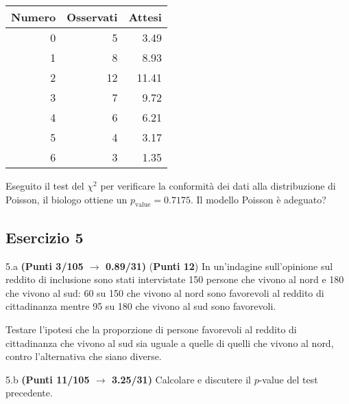 \documentclass[
  11pt,
]{book}
\theoremstyle{mytheoremstyle}
\theoremstyle{mydefstyle}
\begin{document}
\begin{table}[H]
\centering
\begin{tabular}{r|r|r}
\hline
Numero & Osservati & Attesi\\
\hline
0 & 5 & 3.49\\
\hline
1 & 8 & 8.93\\
\hline
2 & 12 & 11.41\\
\hline
3 & 7 & 9.72\\
\hline
4 & 6 & 6.21\\
\hline
5 & 4 & 3.17\\
\hline
6 & 3 & 1.35\\
\hline
\end{tabular}
\end{table}

Eseguito il test del \(\chi^2\) per verificare la conformità dei dati alla distribuzione di Poisson, il biologo ottiene un \(p_\text{value}=0.7175\). Il modello Poisson è adeguato?

\subsection{Esercizio 5}\label{esercizio-5-34}

5.a \textbf{(Punti 3/105 \(\rightarrow\) 0.89/31)} (\textbf{Punti 12}) In un'indagine sull'opinione sul reddito di inclusione sono stati intervistate 150 persone che vivono al nord e 180 che vivono al sud: 60 su 150 che vivono al nord sono favorevoli al reddito di cittadinanza mentre 95 su 180 che vivono al sud sono favorevoli.

Testare l'ipotesi che la proporzione di persone favorevoli al reddito di cittadinanza che vivono al sud sia uguale a quelle di quelli che vivono al nord, contro l'alternativa che siano diverse.

5.b \textbf{(Punti 11/105 \(\rightarrow\) 3.25/31)} Calcolare e discutere il \(p\)-value del test precedente.
\end{document}
